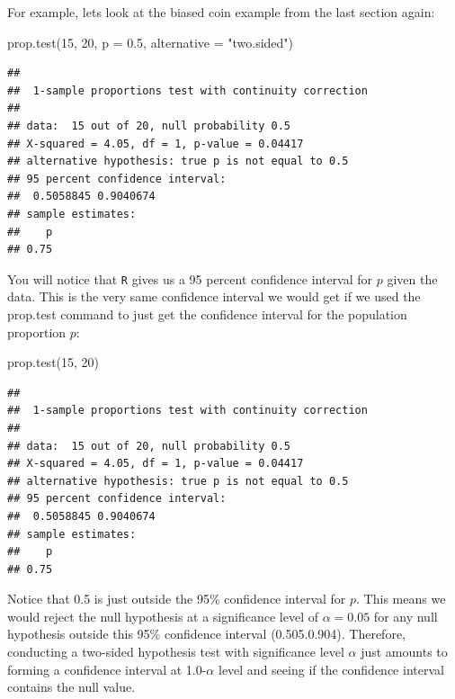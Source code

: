 \documentclass[
]{book}
\newenvironment{Shaded}{\begin{snugshade}}{\end{snugshade}}
\newcommand{\AttributeTok}[1]{\textcolor[rgb]{0.77,0.63,0.00}{#1}}
\newcommand{\DecValTok}[1]{\textcolor[rgb]{0.00,0.00,0.81}{#1}}
\newcommand{\FloatTok}[1]{\textcolor[rgb]{0.00,0.00,0.81}{#1}}
\newcommand{\FunctionTok}[1]{\textcolor[rgb]{0.00,0.00,0.00}{#1}}
\newcommand{\NormalTok}[1]{#1}
\newcommand{\StringTok}[1]{\textcolor[rgb]{0.31,0.60,0.02}{#1}}
\theoremstyle{definition}
\theoremstyle{definition}
\theoremstyle{definition}
\theoremstyle{definition}
\theoremstyle{remark}
\begin{document}
For example, lets look at the biased coin example from the last section again:

\begin{Shaded}
\begin{Highlighting}[]
\FunctionTok{prop.test}\NormalTok{(}\DecValTok{15}\NormalTok{, }\DecValTok{20}\NormalTok{, }\AttributeTok{p =} \FloatTok{0.5}\NormalTok{, }\AttributeTok{alternative =} \StringTok{"two.sided"}\NormalTok{)}
\end{Highlighting}
\end{Shaded}

\begin{verbatim}
## 
##  1-sample proportions test with continuity correction
## 
## data:  15 out of 20, null probability 0.5
## X-squared = 4.05, df = 1, p-value = 0.04417
## alternative hypothesis: true p is not equal to 0.5
## 95 percent confidence interval:
##  0.5058845 0.9040674
## sample estimates:
##    p 
## 0.75
\end{verbatim}

You will notice that \texttt{R} gives us a 95 percent confidence interval for \(p\) given the data. This is the very same confidence interval we would get if we used the prop.test command to just get the confidence interval for the population proportion \(p\):

\begin{Shaded}
\begin{Highlighting}[]
\FunctionTok{prop.test}\NormalTok{(}\DecValTok{15}\NormalTok{, }\DecValTok{20}\NormalTok{)}
\end{Highlighting}
\end{Shaded}

\begin{verbatim}
## 
##  1-sample proportions test with continuity correction
## 
## data:  15 out of 20, null probability 0.5
## X-squared = 4.05, df = 1, p-value = 0.04417
## alternative hypothesis: true p is not equal to 0.5
## 95 percent confidence interval:
##  0.5058845 0.9040674
## sample estimates:
##    p 
## 0.75
\end{verbatim}

Notice that 0.5 is just outside the 95\% confidence interval for \(p\). This means we would reject the null hypothesis at a significance level of \(\alpha=0.05\) for any null hypothesis outside this 95\% confidence interval (0.505.0.904). Therefore, conducting a two-sided hypothesis test with significance level \(\alpha\) just amounts to forming a confidence interval at 1.0-\(\alpha\) level and seeing if the confidence interval contains the null value.
\end{document}
